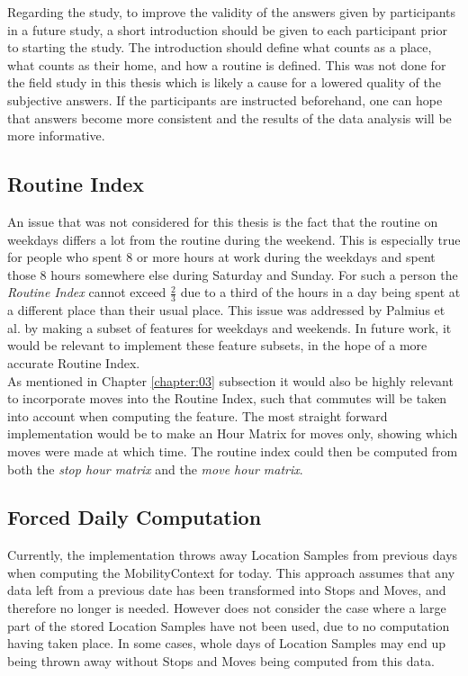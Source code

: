 Regarding the study, to improve the validity of the answers given by participants in a future study, a short introduction should be given to each participant prior to starting the study. The introduction should define what counts as a place, what counts as their home, and how a routine is defined. This was not done for the field study in this thesis which is likely a cause for a lowered quality of the subjective answers. If the participants are instructed beforehand, one can hope that answers become more consistent and the results of the data analysis will be more informative.

\subsection{Routine Index}
An issue that was not considered for this thesis is the fact that the routine on weekdays differs a lot from the routine during the weekend. This is especially true for people who spent 8 or more hours at work during the weekdays and spent those 8 hours somewhere else during Saturday and Sunday. For such a person the \textit{Routine Index} cannot exceed $\frac{2}{3}$ due to a third of the hours in a day being spent at a different place than their usual place. This issue was addressed by Palmius et al. by making a subset of features for weekdays and weekends. In future work, it would be relevant to implement these feature subsets, in the hope of a more accurate Routine Index.\\

As mentioned in Chapter \ref{chapter:03} subsection \label{sub:routine-index} it would also be highly relevant to incorporate moves into the Routine Index, such that commutes will be taken into account when computing the feature. The most straight forward implementation would be to make an Hour Matrix for moves only, showing which moves were made at which time. The routine index could then be computed from both the \textit{stop hour matrix} and the \textit{move hour matrix}.

\subsection{Forced Daily Computation}
Currently, the implementation throws away Location Samples from previous days when computing the MobilityContext for today. This approach assumes that any data left from a previous date has been transformed into Stops and Moves, and therefore no longer is needed. However does not consider the case where a large part of the stored Location Samples have not been used, due to no computation having taken place. In some cases, whole days of Location Samples may end up being thrown away without Stops and Moves being computed from this data.\\

